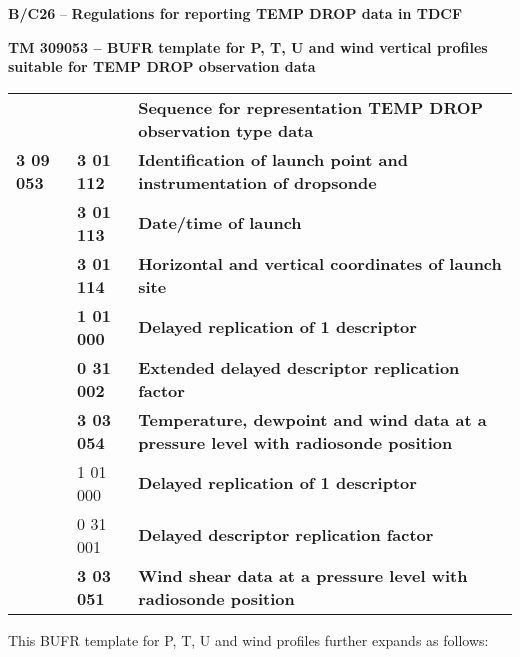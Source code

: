 \textbf{B/C26} -- \textbf{Regulations for reporting TEMP DROP data in TDCF}

\textbf{TM 309053 -- BUFR template for P, T, U and wind vertical profiles suitable for TEMP DROP observation data}

\begin{longtable}[]{@{}lll@{}}
\toprule
\endhead
& & \textbf{Sequence for representation TEMP DROP observation type data}\tabularnewline
\textbf{3 09 053} & \textbf{3 01 112} & \textbf{Identification of launch point and instrumentation of dropsonde}\tabularnewline
& \textbf{3 01 113} & \textbf{Date/time of launch}\tabularnewline
& \textbf{3 01 114} & \textbf{Horizontal and vertical coordinates of launch site}\tabularnewline
& \textbf{1 01 000} & \textbf{Delayed replication of 1 descriptor}\tabularnewline
& \textbf{0 31 002} & \textbf{Extended delayed descriptor replication factor}\tabularnewline
& \textbf{3 03 054} & \textbf{Temperature, dewpoint and wind data at a pressure level with radiosonde position}\tabularnewline
& 1 01 000 & \textbf{Delayed replication of 1 descriptor}\tabularnewline
& 0 31 001 & \textbf{Delayed descriptor replication factor}\tabularnewline
& \textbf{3 03 051} & \textbf{Wind shear data at a pressure level with radiosonde position}\tabularnewline
\bottomrule
\end{longtable}

This BUFR template for P, T, U and wind profiles further expands as follows:

